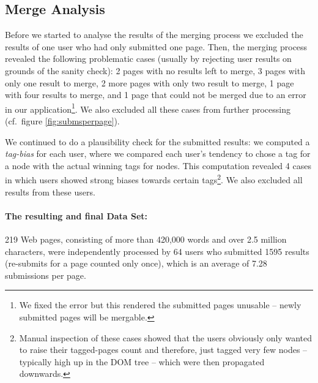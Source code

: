 \begin{longversion}
\subsection{Merge Analysis}

Before we started to analyse the results of the merging process we excluded the results of one user who had only submitted one page. 
Then, the merging process revealed the following problematic cases (usually by rejecting user results on grounds of the sanity check): 
2 pages with no results left to merge,
3 pages with only one result to merge,
2 more pages with only two result to merge,
1 page with four results to merge, and 
1 page that could not be merged due to an error in our application\footnote{We fixed the error but this rendered the submitted pages unusable -- newly submitted pages will be mergable.}.
We also excluded all these cases from further processing (cf.~figure \ref{fig:submsperpage}).


We continued to do a plausibility check for the submitted results:
we computed a \emph{tag-bias} for each user, where we compared each user's tendency to chose a tag for a node with the actual winning tags for nodes. 
This computation revealed 
4 cases in which users showed strong biases towards certain tags\footnote{Manual inspection of these cases showed that the users obviously only wanted to raise their tagged-pages count and therefore, just tagged very few nodes -- typically high up in the DOM tree -- which were then propagated downwards.}.
We also excluded all results from these users.

\paragraph{The resulting and final Data Set:}
219 Web pages, consisting of more than 420,000 words and over 2.5 million characters, were independently processed by
64 users who submitted 
1595 results (re-submits for a page counted only once), which is an average of 7.28 submissions per page. 


\end{longversion}
